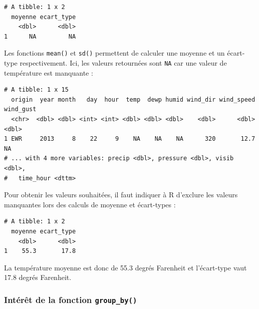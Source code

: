 \documentclass[a4paperpaper,]{article}
\newenvironment{Shaded}{\begin{snugshade}}{\end{snugshade}}
\newcommand{\KeywordTok}[1]{\textcolor[rgb]{0.13,0.29,0.53}{\textbf{#1}}}
\newcommand{\DataTypeTok}[1]{\textcolor[rgb]{0.13,0.29,0.53}{#1}}
\newcommand{\StringTok}[1]{\textcolor[rgb]{0.31,0.60,0.02}{#1}}
\newcommand{\OtherTok}[1]{\textcolor[rgb]{0.56,0.35,0.01}{#1}}
\newcommand{\OperatorTok}[1]{\textcolor[rgb]{0.81,0.36,0.00}{\textbf{#1}}}
\newcommand{\NormalTok}[1]{#1}
\theoremstyle{definition}
\theoremstyle{definition}
\theoremstyle{definition}
\theoremstyle{remark}
\begin{document}
\begin{verbatim}
# A tibble: 1 x 2
  moyenne ecart_type
    <dbl>      <dbl>
1      NA         NA
\end{verbatim}

Les fonctions \texttt{mean()} et \texttt{sd()} permettent de calculer
une moyenne et un écart-type respectivement. Ici, les valeurs retournées
sont \texttt{NA} car une valeur de température est manquante :

\begin{Shaded}
\end{Shaded}

\begin{verbatim}
# A tibble: 1 x 15
  origin  year month   day  hour  temp  dewp humid wind_dir wind_speed wind_gust
  <chr>  <dbl> <dbl> <int> <int> <dbl> <dbl> <dbl>    <dbl>      <dbl>     <dbl>
1 EWR     2013     8    22     9    NA    NA    NA      320       12.7        NA
# ... with 4 more variables: precip <dbl>, pressure <dbl>, visib <dbl>,
#   time_hour <dttm>
\end{verbatim}

Pour obtenir les valeurs souhaitées, il faut indiquer à R d'exclure les
valeurs manquantes lors des calculs de moyenne et écart-types :

\begin{Shaded}
\end{Shaded}

\begin{verbatim}
# A tibble: 1 x 2
  moyenne ecart_type
    <dbl>      <dbl>
1    55.3       17.8
\end{verbatim}

La température moyenne est donc de 55.3 degrés Farenheit et l'écart-type
vaut 17.8 degrés Farenheit.

\subsubsection{\texorpdfstring{Intérêt de la fonction
\texttt{group\_by()}}{Intérêt de la fonction group\_by()}}\label{interet-de-la-fonction-group_by}
\end{document}
